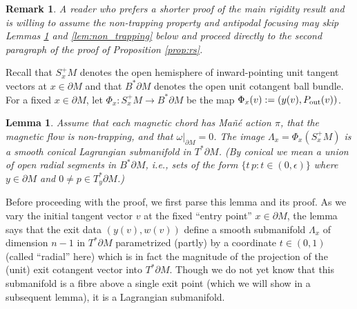 \documentclass[12pt]{amsart}
\numberwithin{equation}{section}
\newtheorem{lemma}[theorem]{Lemma}
\newtheorem{remark}[theorem]{Remark}
\begin{document}
\begin{remark} {\rm A reader who prefers a shorter proof of the main rigidity result and is willing to assume the non-trapping property and antipodal focusing may skip Lemmas \ref{lem:cone} and \ref{lem:non_trapping} below and proceed directly to the second paragraph of the proof of Proposition \ref{prop:rs}.}
\end{remark}

Recall that $S_x^+M$ denotes the open hemisphere of inward-pointing unit tangent vectors at $x\in\partial M$ and that $B^*\partial M$ denotes the open unit cotangent ball bundle. For a fixed $x \in \partial M$, let $\Phi_x : S_x^+ M \to B^*\partial M$ be the map $\Phi_x(v) := (y(v), P_{\rm out}(v))$.

\begin{lemma} \label{lem:cone}
Assume that each magnetic chord has Ma\~n\'e action $\pi$, that the magnetic flow is non-trapping, and that $\omega\vert_{\partial M}=0$.
The image $\Lambda_x = \Phi_x(S_x^+ M)$ is a smooth conical Lagrangian submanifold in $T^*\partial M$. (By conical we mean a union of open radial segments in $B^*\partial M$, i.e., sets of the form $\{ t\,p : t \in (0,\epsilon) \}$ where $y\in \partial M$ and $0\neq p\in T_{y}^*\partial M$.)\label{lemma4.10}
\end{lemma}

Before proceeding with the proof, we first parse this lemma and its proof. As we vary the initial tangent vector $v$ at the fixed ``entry point'' $x\in\partial M$, the lemma says that the exit data $(y(v),w(v))$ define a smooth submanifold $\Lambda_x$ of dimension $n-1$ in $T^*\partial M$ parametrized (partly) by a coordinate $t\in (0,1)$ (called ``radial'' here) which is in fact the magnitude of the projection of the (unit) exit cotangent vector into $T^*\partial M$. Though we do not yet know that this submanifold is a fibre above a single exit point (which we will show in a subsequent lemma), it is a Lagrangian submanifold.
\end{document}
